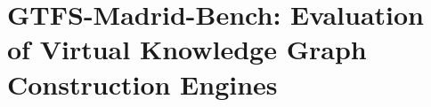 
\section{GTFS-Madrid-Bench: Evaluation of Virtual Knowledge Graph Construction Engines}
\label{chapter5:sec-bench}


